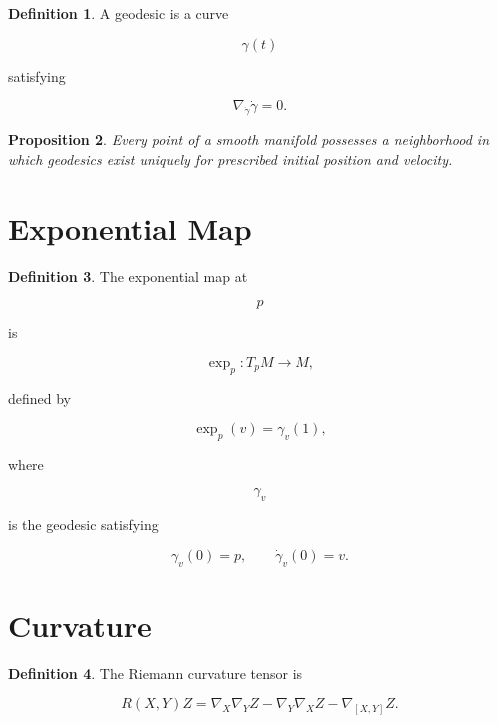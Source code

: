 \documentclass[11pt]{book}
\numberwithin{equation}{chapter}
\theoremstyle{definition}
\newtheorem{definition}{Definition}[chapter]
\theoremstyle{plain}
\newtheorem{proposition}[definition]{Proposition}
\begin{document}
\begin{definition}

A geodesic is a curve

\[
\gamma(t)
\]

satisfying

\[
\nabla_{\dot\gamma}
\dot\gamma
=
0.
\]

\end{definition}


\begin{proposition}

Every point of a smooth manifold possesses a neighborhood in which
geodesics exist uniquely for prescribed initial position and velocity.

\end{proposition}


\section{Exponential Map}

\begin{definition}

The exponential map at

\[
p
\]

is

\[
\exp_p
:
T_pM
\rightarrow
M,
\]

defined by

\[
\exp_p(v)
=
\gamma_v(1),
\]

where

\[
\gamma_v
\]

is the geodesic satisfying

\[
\gamma_v(0)=p,
\qquad
\dot\gamma_v(0)=v.
\]

\end{definition}


\section{Curvature}

\begin{definition}

The Riemann curvature tensor is

\[
R(X,Y)Z
=
\nabla_X\nabla_YZ
-
\nabla_Y\nabla_XZ
-
\nabla_{[X,Y]}Z.
\]

\end{definition}
\end{document}
